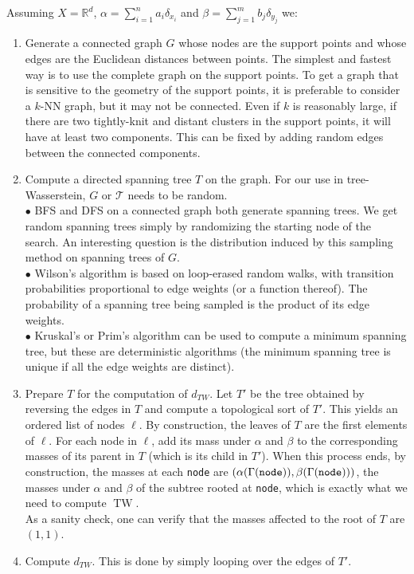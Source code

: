 \documentclass[12pt]{report}
\theoremstyle{definition}
\theoremstyle{remark}
\DeclareMathOperator{\tw}{TW}
\begin{document}
Assuming $X=\mathbb R^d$, $\alpha=\sum_{i=1}^n a_i \delta_{x_i}$ and $\beta=\sum_{j=1}^m b_j \delta_{y_j}$ we:
	\begin{enumerate}
    \item Generate a connected graph $G$ whose nodes are the support points and whose edges are the Euclidean distances between points. The simplest and fastest way is to use the complete graph on the support points. To get a graph that is sensitive to the geometry of the support points, it is preferable to consider a $k$-NN graph, but it may not be connected. Even if $k$ is reasonably large, if there are two tightly-knit and distant clusters in the support points, it will have at least two components. This can be fixed by adding random edges between the connected components.

    \item Compute a directed spanning tree $T$ on the graph. For our use in tree-Wasserstein, $G$ or $\mathcal T$ needs to be random.\\
    $\bullet$ BFS and DFS on a connected graph both generate spanning trees. We get random spanning trees simply by randomizing the starting node of the search. An interesting question is the distribution induced by this sampling method on spanning trees of $G$.\\
    $\bullet$ Wilson's algorithm \cite[Theorem~4.1]{lyons2017probability} is based on loop-erased random walks, with transition probabilities proportional to edge weights (or a function thereof). The probability of a spanning tree being sampled is the product of its edge weights.\\
    $\bullet$ Kruskal's or Prim's algorithm can be used to compute a minimum spanning tree, but these are deterministic algorithms (the minimum spanning tree is unique if all the edge weights are distinct).

    \item Prepare $T$ for the computation of $d_{TW}$. Let $T'$ be the tree obtained by reversing the edges in $T$ and compute a topological sort of $T'$. This yields an ordered list of nodes $\ell$. By construction, the leaves of $T$ are the first elements of $\ell$. For each node in $\ell$, add its mass under $\alpha$ and $\beta$ to the corresponding masses of its parent in $T$ (which is its child in $T'$). When this process ends, by construction, the masses at each \verb!node! are $(\alpha(\Gamma(\verb!node!)), \beta(\Gamma(\verb!node!)))$, the masses under $\alpha$ and $\beta$ of the subtree rooted at \verb!node!, which is exactly what we need to compute $\tw$.\\
    As a sanity check, one can verify that the masses affected to the root of $T$ are $(1,1)$.
    \item Compute $d_{TW}$. This is done by simply looping over the edges of $T'$.
    \end{enumerate}
\end{document}
